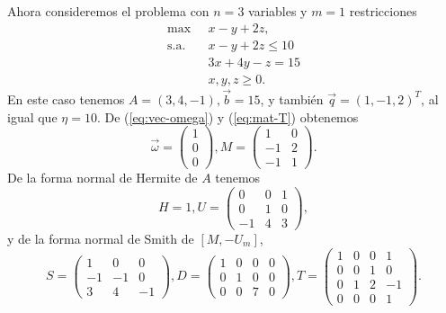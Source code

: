 \begin{example}
	Ahora consideremos el problema con $n = 3$ variables y $m = 1$ restricciones
	\begin{align*}
		\max
			~& x - y + 2z, \\
		\text{s.a.} \quad
			& x - y  + 2z \leq 10 \\
			& 3x + 4y - z = 15 \\
			& x, y, z \geq 0.
	\end{align*}
	En este caso tenemos $A = (3, 4, -1), \vec{b} = 15$, y también $\vec{q} = (1, -1, 2)^T$, al igual que
	$\eta = 10$. De (\ref{eq:vec-omega}) y (\ref{eq:mat-T}) obtenemos
	\begin{equation*}
		\vec{\omega} = \begin{pmatrix} 1 \\ 0 \\ 0 \end{pmatrix},
		M = \begin{pmatrix} 1 & 0 \\ -1 & 2 \\ -1 & 1 \end{pmatrix}.
	\end{equation*}
	De la forma normal de Hermite de $A$ tenemos
	\begin{equation*}
		H = 1, U = \begin{pmatrix} 0 & 0 & 1 \\ 0 & 1 & 0 \\ -1 & 4 & 3 \end{pmatrix},
	\end{equation*}
	y de la forma normal de Smith de $[M, -U_m]$,
	\begin{equation*}
		S = \begin{pmatrix}
			1 & 0 & 0 \\
			-1 & -1 & 0 \\
			3 & 4 & -1
		\end{pmatrix},
		D = \begin{pmatrix}
			1 & 0 & 0 & 0 \\
			0 & 1 & 0 & 0 \\
			0 & 0 & 7 & 0
		\end{pmatrix},
		T = \begin{pmatrix}
			1 & 0 & 0 & 1 \\
			0 & 0 & 1 & 0 \\
			0 & 1 & 2 & -1 \\
			0 & 0 & 0 & 1
		\end{pmatrix}.
	\end{equation*}

\end{example}
